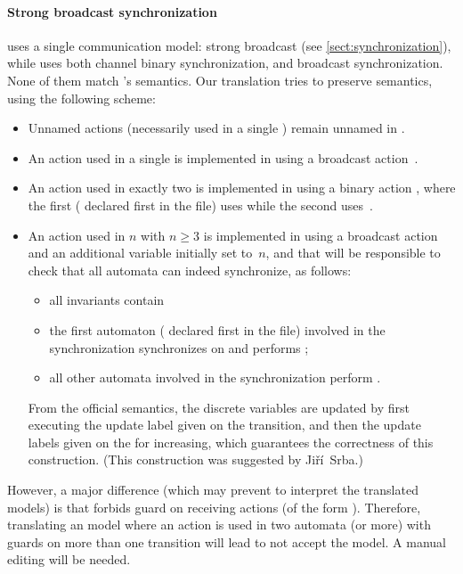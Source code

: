 \paragraph{Strong broadcast synchronization}
\imitator{} uses a single communication model: strong broadcast (see \cref{sect:synchronization}), while \uppaal{} uses both channel binary synchronization, and broadcast synchronization.
None of them match \imitator{}'s semantics.
Our translation tries to preserve \imitator{} semantics, using the following scheme:
\begin{itemize}
	\item Unnamed actions (necessarily used in a single \IPTA{}) remain unnamed in \uppaal{}.
	\item An action  used in a single \IPTA{} is implemented in \uppaal{} using a broadcast action~.
	\item An action  used in exactly two \IPTA{} is implemented in \uppaal{} using a binary action , where the first (\ie{} declared first in the \imitator{} file) uses  while the second uses~.
	\item An action  used in $n$ \IPTA{} with $n \geq 3$ is implemented in \uppaal{} using a broadcast action  and an additional variable  initially set to~$n$, and that will be responsible to check that all automata can indeed synchronize, as follows:
	      \begin{itemize}
		      \item all invariants contain 
		      \item the first automaton (\ie{} declared first in the \imitator{} file) involved in the synchronization synchronizes on  and performs ;
		      \item all other automata involved in the synchronization perform .
	      \end{itemize}
	      From the \uppaal{} official semantics, the discrete variables are updated by first executing the update label given on the  transition, and then the update labels given on the  for increasing, which guarantees the correctness of this construction.
	      (This construction was suggested by Jiří~Srba.)
\end{itemize}
However, a major difference (which may prevent \uppaal{} to interpret the translated models) is that \uppaal{} forbids guard on receiving actions (of the form ).
Therefore, translating an \imitator{} model where an action  is used in two automata (or more) with guards on more than one transition will lead \uppaal{} to not accept the model.
A manual editing will be needed.

